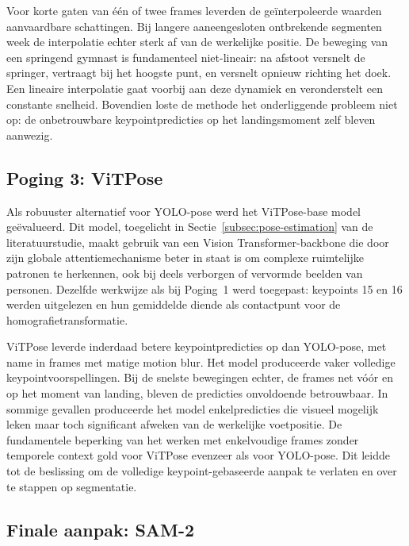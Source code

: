 
Voor korte gaten van één of twee frames leverden de geïnterpoleerde waarden aanvaardbare schattingen. Bij langere aaneengesloten ontbrekende segmenten week de interpolatie echter sterk af van de werkelijke positie. De beweging van een springend gymnast is fundamenteel niet-lineair: na afstoot versnelt de springer, vertraagt bij het hoogste punt, en versnelt opnieuw richting het doek. Een lineaire interpolatie gaat voorbij aan deze dynamiek en veronderstelt een constante snelheid. Bovendien loste de methode het onderliggende probleem niet op: de onbetrouwbare keypointpredicties op het landingsmoment zelf bleven aanwezig.

\subsection{Poging 3: ViTPose}
\label{subsec:landingspositie-vitpose}

Als robuuster alternatief voor YOLO-pose werd het ViTPose-base model \autocite{Xu2022} ge{\"e}valueerd. Dit model, toegelicht in Sectie~\ref{subsec:pose-estimation} van de literatuurstudie, maakt gebruik van een Vision Transformer-backbone die door zijn globale attentiemechanisme beter in staat is om complexe ruimtelijke patronen te herkennen, ook bij deels verborgen of vervormde beelden van personen. Dezelfde werkwijze als bij Poging~1 werd toegepast: keypoints 15 en 16 werden uitgelezen en hun gemiddelde diende als contactpunt voor de homografietransformatie.

ViTPose leverde inderdaad betere keypointpredicties op dan YOLO-pose, met name in frames met matige motion blur. Het model produceerde vaker volledige keypointvoorspellingen. Bij de snelste bewegingen echter, de frames net vóór en op het moment van landing, bleven de predicties onvoldoende betrouwbaar. In sommige gevallen produceerde het model enkelpredicties die visueel mogelijk leken maar toch significant afweken van de werkelijke voetpositie. De fundamentele beperking van het werken met enkelvoudige frames zonder temporele context gold voor ViTPose evenzeer als voor YOLO-pose. Dit leidde tot de beslissing om de volledige keypoint-gebaseerde aanpak te verlaten en over te stappen op segmentatie.

\subsection{Finale aanpak: SAM-2}
\label{subsec:landingspositie-sam2}

